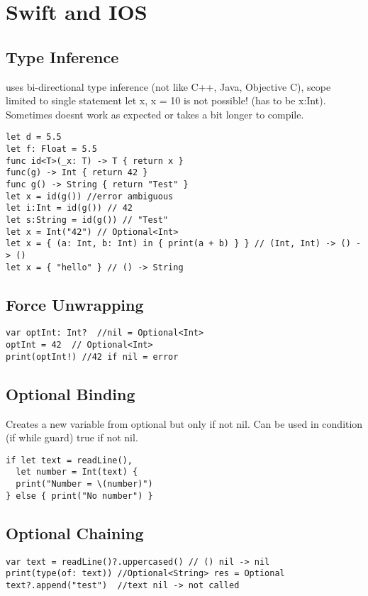 \section{Swift and IOS}

\subsection{Type Inference}
uses bi-directional type inference (not like C++, Java, Objective C), scope limited to single statement
let x, x = 10 is not possible! (has to be x:Int). Sometimes doesnt work as expected or takes a bit longer to compile.
\begin{lstlisting}
let d = 5.5
let f: Float = 5.5
func id<T>(_x: T) -> T { return x }
func(g) -> Int { return 42 }
func g() -> String { return "Test" }
let x = id(g()) //error ambiguous
let i:Int = id(g()) // 42
let s:String = id(g()) // "Test"
let x = Int("42") // Optional<Int>
let x = { (a: Int, b: Int) in { print(a + b) } } // (Int, Int) -> () -> ()
let x = { "hello" } // () -> String
\end{lstlisting}

\subsection{Force Unwrapping}
\begin{lstlisting}
var optInt: Int?  //nil = Optional<Int>
optInt = 42  // Optional<Int>
print(optInt!) //42 if nil = error
\end{lstlisting}

\subsection{Optional Binding}
Creates a new variable from optional but only if not nil. Can be used in condition (if while guard) true if not nil.
\begin{lstlisting}
if let text = readLine(),
  let number = Int(text) {
  print("Number = \(number)")
} else { print("No number") }
\end{lstlisting}

\subsection{Optional Chaining}
\begin{lstlisting}
var text = readLine()?.uppercased() // () nil -> nil
print(type(of: text)) //Optional<String> res = Optional
text?.append("test")  //text nil -> not called
\end{lstlisting}

